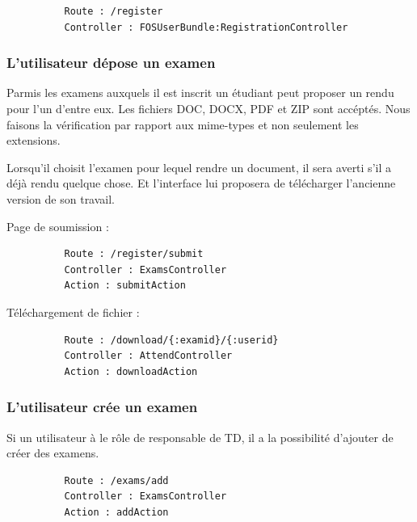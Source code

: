 \documentclass{report}
\begin{document}
        \begin{verbatim}
          Route : /register 
          Controller : FOSUserBundle:RegistrationController  
        \end{verbatim}
      \subsubsection{L'utilisateur dépose un examen}
        Parmis les examens auxquels il est inscrit un étudiant peut proposer un rendu pour
        l'un d'entre eux. Les fichiers DOC, DOCX, PDF et ZIP sont accéptés. Nous faisons
        la vérification par rapport aux mime-types et non seulement les extensions.

        Lorsqu'il choisit l'examen pour lequel rendre un document, il sera averti s'il a
        déjà rendu quelque chose. Et l'interface lui proposera de télécharger l'ancienne
        version de son travail.

        Page de soumission :
        \begin{verbatim}
          Route : /register/submit
          Controller : ExamsController
          Action : submitAction
        \end{verbatim}
        Téléchargement de fichier :
        \begin{verbatim}
          Route : /download/{:examid}/{:userid}
          Controller : AttendController
          Action : downloadAction
        \end{verbatim}
      \subsubsection{L'utilisateur crée un examen}
        Si un utilisateur à le rôle de responsable de TD, il a la possibilité d'ajouter
        de créer des examens.
        
        \begin{verbatim}
          Route : /exams/add
          Controller : ExamsController
          Action : addAction
        \end{verbatim}
\end{document}
